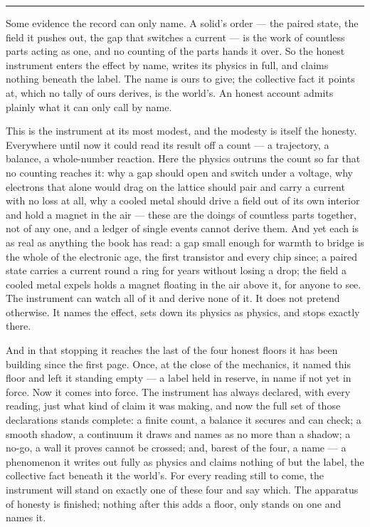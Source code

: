 \bigskip
\begin{center}
\rule{0.4\textwidth}{0.4pt}
\end{center}
\bigskip

\noindent Some evidence the record can only name. A solid's order --- the paired state, the field it pushes
out, the gap that switches a current --- is the work of countless parts acting as one, and no counting of the
parts hands it over. So the honest instrument enters the effect by name, writes its physics in full, and claims
nothing beneath the label. The name is ours to give; the collective fact it points at, which no tally of ours
derives, is the world's. An honest account admits plainly what it can only call by name.

This is the instrument at its most modest, and the modesty is itself the honesty. Everywhere until now it could
read its result off a count --- a trajectory, a balance, a whole-number reaction. Here the physics outruns the
count so far that no counting reaches it: why a gap should open and switch under a voltage, why electrons that
alone would drag on the lattice should pair and carry a current with no loss at all, why a cooled metal should
drive a field out of its own interior and hold a magnet in the air --- these are the doings of countless parts
together, not of any one, and a ledger of single events cannot derive them. And yet each is as real as anything
the book has read: a gap small enough for warmth to bridge is the whole of the electronic age, the first
transistor and every chip since; a paired state carries a current round a ring for years without losing a drop;
the field a cooled metal expels holds a magnet floating in the air above it, for anyone to see. The instrument
can watch all of it and derive none of it. It does not pretend otherwise. It names the effect, sets down its
physics as physics, and stops exactly there.

And in that stopping it reaches the last of the four honest floors it has been building since the first page.
Once, at the close of the mechanics, it named this floor and left it standing empty --- a label held in reserve,
in name if not yet in force. Now it comes into force. The instrument has always declared, with every reading,
just what kind of claim it was making, and now the full set of those declarations stands complete: a finite
count, a balance it secures and can check; a smooth shadow, a continuum it draws and names as no more than a
shadow; a no-go, a wall it proves cannot be crossed; and, barest of the four, a name --- a phenomenon it writes
out fully as physics and claims nothing of but the label, the collective fact beneath it the world's. For every
reading still to come, the instrument will stand on exactly one of these four and say which. The apparatus of
honesty is finished; nothing after this adds a floor, only stands on one and names it.

